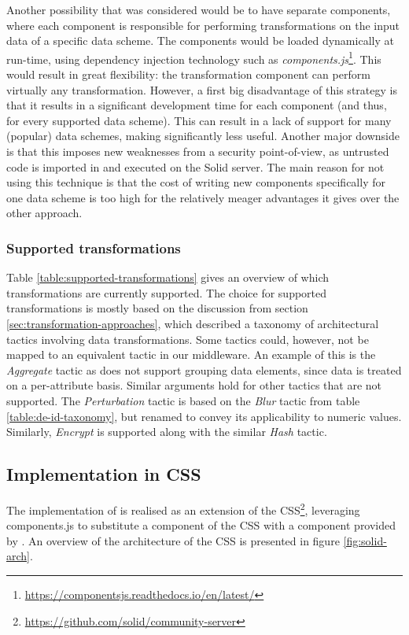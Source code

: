 \noindent Another possibility that was considered would be to have separate components, where each component is responsible for performing transformations on the input data of a specific data scheme. The components would be loaded dynamically at run-time, using dependency injection technology such as \textit{components.js}\footnote{\url{https://componentsjs.readthedocs.io/en/latest/}}. This would result in great flexibility: the transformation component can perform virtually any transformation. However, a first big disadvantage of this strategy is that it results in a significant development time for each component (and thus, for every supported data scheme). This can result in a lack of support for many (popular) data schemes, making \middleware{} significantly less useful. Another major downside is that this imposes new weaknesses from a security point-of-view, as untrusted code is imported in and executed on the Solid server. The main reason for not using this technique is that the cost of writing new components specifically for one data scheme is too high for the relatively meager advantages it gives over the other approach. 




\subsubsection{Supported transformations}
Table \ref{table:supported-transformations} gives an overview of which transformations are currently supported. The choice for supported transformations is mostly based on the discussion from section \ref{sec:transformation-approaches}, which described a taxonomy of architectural tactics involving data transformations. Some tactics could, however, not be mapped to an equivalent tactic in our middleware. An example of this is the \textit{Aggregate} tactic as \middleware{} does not support grouping data elements, since data is treated on a per-attribute basis. Similar arguments hold for other tactics that are not supported. The \textit{Perturbation} tactic is based on the \textit{Blur} tactic from table \ref{table:de-id-taxonomy}, but renamed to convey its applicability to numeric values. Similarly, \textit{Encrypt} is supported along with the similar \textit{Hash} tactic.

\subsection{Implementation in CSS}
The implementation of \middleware{} is realised as an extension of the \acrlong{CSS}\footnote{\url{https://github.com/solid/community-server}}, leveraging components.js to substitute a component of the \gls{CSS} with a component provided by \middleware{}. An overview of the architecture of the \gls{CSS} is presented in figure \ref{fig:solid-arch}.

